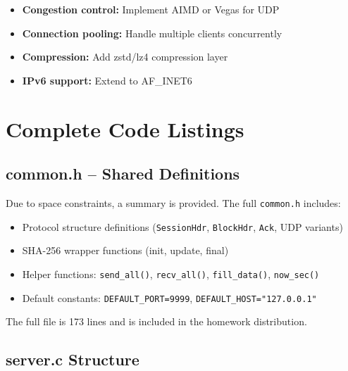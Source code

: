 \documentclass[12pt,a4paper]{article}
\begin{document}
\begin{itemize}
  \item \textbf{Congestion control:} Implement AIMD or Vegas for UDP
  \item \textbf{Connection pooling:} Handle multiple clients concurrently
  \item \textbf{Compression:} Add zstd/lz4 compression layer
  \item \textbf{IPv6 support:} Extend to AF\_INET6
\end{itemize}

\appendix

\section{Complete Code Listings}
\label{app:code}

\subsection{common.h – Shared Definitions}

Due to space constraints, a summary is provided. The full \texttt{common.h} includes:

\begin{itemize}
  \item Protocol structure definitions (\texttt{SessionHdr}, \texttt{BlockHdr}, \texttt{Ack}, UDP variants)
  \item SHA-256 wrapper functions (init, update, final)
  \item Helper functions: \texttt{send\_all()}, \texttt{recv\_all()}, \texttt{fill\_data()}, \texttt{now\_sec()}
  \item Default constants: \texttt{DEFAULT\_PORT=9999}, \texttt{DEFAULT\_HOST="127.0.0.1"}
\end{itemize}

The full file is 173 lines and is included in the homework distribution.

\subsection{server.c Structure}
\end{document}
